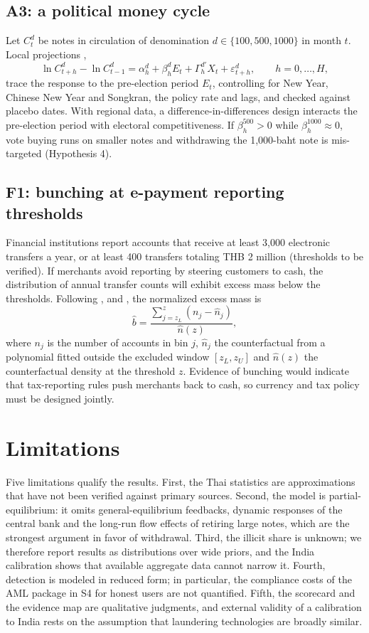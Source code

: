 \documentclass[11pt]{article}
\theoremstyle{definition}
\theoremstyle{remark}
\begin{document}
\subsection{A3: a political money cycle}
Let $C^d_t$ be notes in circulation of denomination $d\in\{100,500,1000\}$ in month $t$. Local projections
\citep{jorda2005},
\begin{equation}
\ln C^d_{t+h}-\ln C^d_{t-1}=\alpha^d_h+\beta^d_h E_t+\Gamma^{d\prime}_h X_t+\varepsilon^d_{t+h},\qquad h=0,\dots,H,
\end{equation}
trace the response to the pre-election period $E_t$, controlling for New Year, Chinese New Year and Songkran, the policy
rate and lags, and checked against placebo dates. With regional data, a difference-in-differences design interacts the
pre-election period with electoral competitiveness. If $\beta^{500}_h>0$ while $\beta^{1000}_h\approx0$, vote buying runs on
smaller notes and withdrawing the 1,000-baht note is mis-targeted (Hypothesis 4).

\subsection{F1: bunching at e-payment reporting thresholds}
Financial institutions report accounts that receive at least 3,000 electronic transfers a year, or at least 400 transfers
totaling THB 2 million (thresholds to be verified). If merchants avoid reporting by steering customers to cash, the
distribution of annual transfer counts will exhibit excess mass below the thresholds. Following \citet{saez2010},
\citet{kleven2013} and \citet{kleven2016}, the normalized excess mass is
\begin{equation}
\hat b=\frac{\sum_{j=z_L}^{z}\left(n_j-\hat n_j\right)}{\hat n(z)},
\end{equation}
where $n_j$ is the number of accounts in bin $j$, $\hat n_j$ the counterfactual from a polynomial fitted outside the
excluded window $[z_L,z_U]$ and $\hat n(z)$ the counterfactual density at the threshold $z$. Evidence of bunching would
indicate that tax-reporting rules push merchants back to cash, so currency and tax policy must be designed jointly.

\section{Limitations}\label{sec:limits}
Five limitations qualify the results. First, the Thai statistics are approximations that have not been verified against
primary sources. Second, the model is partial-equilibrium: it omits general-equilibrium feedbacks, dynamic responses of the
central bank and the long-run flow effects of retiring large notes, which are the strongest argument in favor of
withdrawal. Third, the illicit share is unknown; we therefore report results as distributions over wide priors, and the
India calibration shows that available aggregate data cannot narrow it. Fourth, detection is modeled in reduced form; in
particular, the compliance costs of the AML package in S4 for honest users are not quantified. Fifth, the scorecard and
the evidence map are qualitative judgments, and external validity of a calibration to India rests on the assumption that
laundering technologies are broadly similar.
\end{document}
